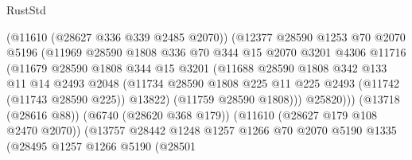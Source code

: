 \begin{lexlean}{RustStd}
\begin{coremodule}
                              (@11610 (@28627 @336 @339 @2485 @2070))
                              (@12377
                                @28590
                                @1253
                                @70
                                @2070
                                @5196
                                (@11969
                                  @28590
                                  @1808
                                  @336
                                  @70
                                  @344
                                  @15
                                  @2070
                                  @3201
                                  @4306
                                  @11716
                                  (@11679
                                    @28590
                                    @1808
                                    @344
                                    @15
                                    @3201
                                    (@11688
                                      @28590
                                      @1808
                                      @342
                                      @133
                                      @11
                                      @14
                                      @2493
                                      @2048
                                      (@11734
                                        @28590
                                        @1808
                                        @225
                                        @11
                                        @225
                                        @2493
                                        (@11742 (@11743 @28590 @225))
                                        @13822)
                                      (@11759 @28590 @1808)))
                                  @25820)))
                            (@13718 (@28616 @88))
                            (@6740 (@28620 @368 @179))
                            (@11610 (@28627 @179 @108 @2470 @2070))
                            (@13757
                              @28442
                              @1248
                              @1257
                              @1266
                              @70
                              @2070
                              @5190
                              @1335
                              (@28495
                                @1257
                                @1266
                                @5190
                                (@28501

\end{coremodule}
\end{lexlean}
